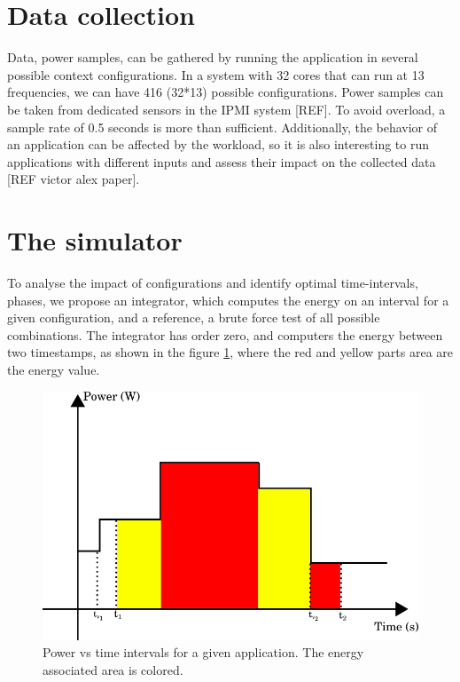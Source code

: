 \section{Data collection} \label{sec:data_collection}
Data, power samples, can be gathered by running the application in several possible context configurations. In a system with 32 cores that can run at 13 frequencies, we can have 416 (32*13) possible configurations. Power samples can be taken from dedicated sensors in the IPMI system [REF]. To avoid overload, a sample rate of 0.5 seconds is more than sufficient. Additionally, the behavior of an application can be affected by the workload, so it is also interesting to run applications with different inputs and assess their impact on the collected data [REF victor alex paper].


\section{The simulator} \label{sec:the_simulator}
To analyse the impact of configurations and identify optimal time-intervals, phases, we propose an integrator, which computes the energy on an interval for a given configuration, and a reference, a brute force test of all possible combinations. The integrator has order zero, and computers the energy between two timestamps, as shown in the figure \ref{fig:zero_order}, where the red and yellow parts area are the energy value.


\begin{figure}[H]
    \centering
    \includegraphics[width=\columnwidth]{phases/figures/zero_order.png}
    \caption{Power vs time intervals for a given application. The energy associated area is colored.}
    \label{fig:zero_order}
\end{figure}

